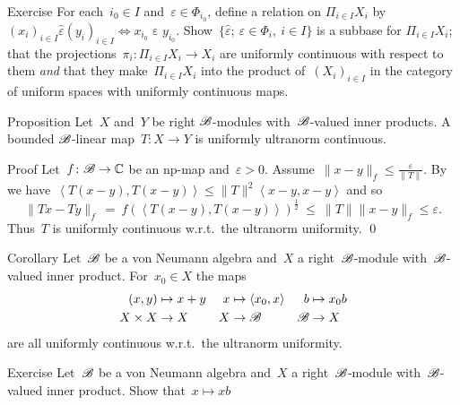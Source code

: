 \documentclass[b]{subfiles}
\begin{document}
\begin{parsec}
\begin{point}{Exercise}
    For each~$i_0 \in I$
    and~$\varepsilon \in \Phi_{i_0}$,
    define a relation on
    $\Pi_{i \in I} X_i$ by
    $(x_i)_{i \in I} \mathrel{\hat\varepsilon} (y_i)_{i \in I}
    \iff x_{i_0} \mathrel\varepsilon y_{i_0}$.
    Show~$\{ \hat\varepsilon;\ \varepsilon \in \Phi_i, \ i\in I \}$
    is a subbase for $\Pi_{i \in I} X_i$;
    that the projections~$\pi_i \colon \Pi_{i \in I} X_i \to X_i$
    are uniformly continuous with respect to them
    \emph{and} that they make~$\Pi_{i \in I} X_i$
    into the product of~$(X_i)_{i \in I}$
    in the category of uniform spaces with uniformly continuous maps.
\end{point}
\end{parsec}

\begin{parsec}%
\begin{point}{Proposition}%
Let~$X$ and~$Y$ be right $\mathscr{B}$-modules
    with~$\mathscr{B}$-valued inner products.
A bounded $\mathscr{B}$-linear map~$T\colon X \to Y$
    is uniformly ultranorm continuous.
\begin{point}{Proof}%
Let~$f\colon \mathscr{B} \to \mathbb{C}$ be an np-map
    and~$\varepsilon > 0$.
Assume~$\|x-y\|_f \leq \frac{\varepsilon}{\|T\|}$.
By 
we have~$\left<T(x-y), T(x-y)\right> \leq \|T\|^2\left<x-y,x-y\right>$
and so
\begin{equation*}
    \|Tx - Ty\|_f \  =\  f(\left<T(x-y),T(x-y)\right>)^{\frac{1}{2}}
\ \leq\  \|T\| \|x-y\|_f \leq \varepsilon.
\end{equation*}
Thus~$T$ is uniformly continuous w.r.t.~the ultranorm uniformity. \qed
\end{point}
\end{point}
\begin{point}[ultranormcontstruct]{Corollary}%
Let~$\mathscr{B}$ be a von Neumann algebra
    and~$X$ a right~$\mathscr{B}$-module
    with~$\mathscr{B}$-valued inner product.
For~$x_0 \in X$ the maps
\begin{align*}
    (x,y) &\mapsto x+y & x &\mapsto \left<x_0, x\right>
    & b &\mapsto x_0 b \\
    X\times X &\to X & X &\to \mathscr{B} & \mathscr{B} & \to X
\end{align*}
are all uniformly continuous w.r.t.~the ultranorm uniformity.
\end{point}
\begin{point}[ultranormscalar]{Exercise}%
Let~$\mathscr{B}$ be a von Neumann algebra and~$X$ a right~$\mathscr{B}$-module
    with~$\mathscr{B}$-valued inner product.
Show that~$x \mapsto xb$

\end{point}
\end{parsec}
\end{document}
